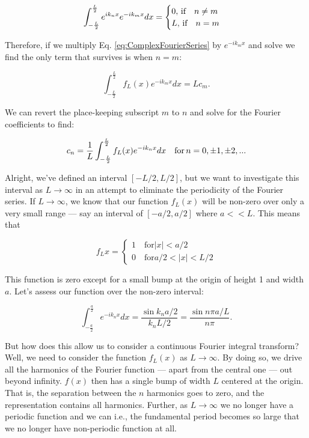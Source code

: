 \begin{equation}
	\int_{-\frac{L}{2}}^{\frac{L}{2}} e^{i k_n x} e^{-i k_m x} dx =
		\begin{cases}
		0, \text{\,if} \quad n \neq m\\
		L, \text{\,if} \quad n = m\\
	\end{cases}
\end{equation}

Therefore, if we multiply Eq. \ref{eq:ComplexFourierSeries} by $e^{-i k_m x}$ and solve we find the only term that survives is when $n=m$:

\begin{equation}
	\int_{-\frac{L}{2}}^{\frac{L}{2}} f_L(x) e^{-i k_m x} dx = L c_m.
\end{equation}

We can revert the place-keeping subscript $m$ to $n$ and solve for the Fourier coefficients to find:

\begin{equation}
	 c_n = \frac{1}{L}\int_{-\frac{L}{2}}^{\frac{L}{2}} f_L(x) e^{-i k_n x} dx \quad \text{for\,} n = 0, \pm1, \pm2,...
	\label{eq:FourierComps}
\end{equation}

Alright, we've defined an interval $[-L/2, L/2]$, but we want to investigate this interval as $L \rightarrow \infty$ in an attempt to eliminate the periodicity of the Fourier series. If $L \rightarrow \infty$, we know that our function $f_L(x)$ will be non-zero over only a very small range --- say an interval of $[-a/2, a/2]$ where $a << L$. This means that

\begin{equation}
	f_L{x} =
	\begin{cases}
		1 \quad \text{for} |x|<a/2\\
		0 \quad \text{for} a/2 < |x| < L/2
	\end{cases}
\label{eq:Linfty}
\end{equation}

This function is zero except for a small bump at the origin of height 1 and width $a$. Let's assess our function over the non-zero interval:

\begin{equation}
	\int_{-\frac{a}{2}}^{\frac{a}{2}} e^{-i k_n x} dx = \frac{\sin k_n a/2}{k_n L/2} = \frac{\sin n \pi a/L}{n \pi}.
	\label{eq:Thing}
\end{equation}

But how does this allow us to consider a continuous Fourier integral transform? Well, we need to consider the function $f_L(x)$ as $L \rightarrow \infty$. By doing so, we drive all the harmonics of the Fourier function --- apart from the central one --- out beyond infinity. $f(x)$ then has a single bump of width $L$ centered at the origin. That is, the separation between the $n$ harmonics goes to zero, and the representation contains all harmonics. Further, as $L \rightarrow \infty$ we no longer have a periodic function and we can i.e., the fundamental period becomes so large that we no longer have non-periodic function at all. %

